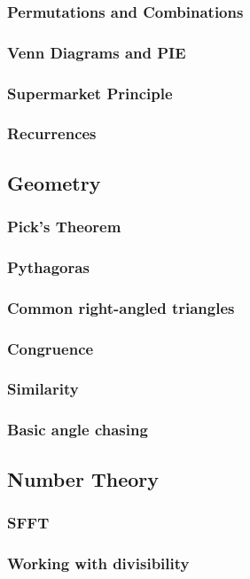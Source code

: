 \documentclass{amsart}
\begin{document}
\subsubsection{Permutations and Combinations}
\subsubsection{Venn Diagrams and PIE}
\subsubsection{Supermarket Principle}
\subsubsection{Recurrences}
\subsection{Geometry}
\subsubsection{Pick's Theorem}
\subsubsection{Pythagoras}
\subsubsection{Common right-angled triangles}
\subsubsection{Congruence}
\subsubsection{Similarity}
\subsubsection{Basic angle chasing}
\subsection{Number Theory}
\subsubsection{SFFT}
\subsubsection{Working with divisibility}
\end{document}
